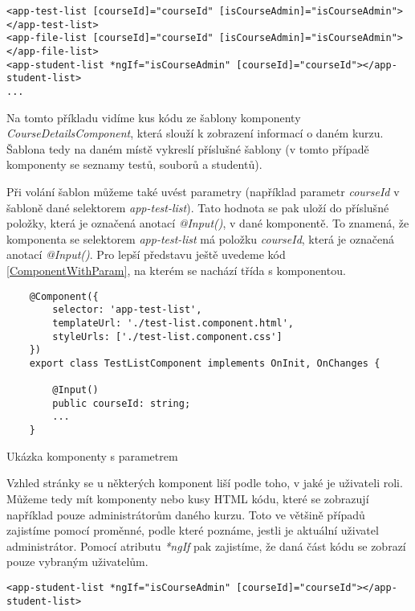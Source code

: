 \begin{lstlisting}
<app-test-list [courseId]="courseId" [isCourseAdmin]="isCourseAdmin"></app-test-list>
<app-file-list [courseId]="courseId" [isCourseAdmin]="isCourseAdmin"></app-file-list>
<app-student-list *ngIf="isCourseAdmin" [courseId]="courseId"></app-student-list>
...
\end{lstlisting}

Na tomto příkladu vidíme kus kódu ze šablony komponenty \textit{CourseDetailsComponent}, která slouží k zobrazení informací o daném kurzu. Šablona tedy na daném místě vykreslí příslušné šablony (v tomto případě komponenty se seznamy testů, souborů a studentů).

Při volání šablon můžeme také uvést parametry (například parametr \textit{courseId} v šabloně dané selektorem \textit{app-test-list}). Tato hodnota se pak uloží do příslušné položky, která je označená anotací \textit{@Input()}, v dané komponentě. To znamená, že komponenta se selektorem \textit{app-test-list} má položku \textit{courseId}, která je označená anotací \textit{@Input()}. Pro lepší představu ještě uvedeme kód \ref{ComponentWithParam}, na kterém se nachází třída s komponentou.

\lstset{style=typescript}

\begin{program}
	\begin{lstlisting}
	@Component({
		selector: 'app-test-list',
		templateUrl: './test-list.component.html',
		styleUrls: ['./test-list.component.css']
	})
	export class TestListComponent implements OnInit, OnChanges {
	
		@Input()
		public courseId: string;
		...
	}
	\end{lstlisting}
	\caption{Ukázka komponenty s parametrem}
	\label{ComponentWithParam}
\end{program}

\vspace{\baselineskip}

Vzhled stránky se u některých komponent liší podle toho, v jaké je uživateli roli. Můžeme tedy mít komponenty nebo kusy HTML kódu, které se zobrazují například pouze administrátorům daného kurzu.
Toto ve většině případů zajistíme pomocí proměnné, podle které poznáme, jestli je aktuální uživatel administrátor.
Pomocí atributu \textit{*ngIf} pak zajistíme, že daná část kódu se zobrazí pouze vybraným uživatelům.

\begin{lstlisting}
<app-student-list *ngIf="isCourseAdmin" [courseId]="courseId"></app-student-list>
\end{lstlisting}

